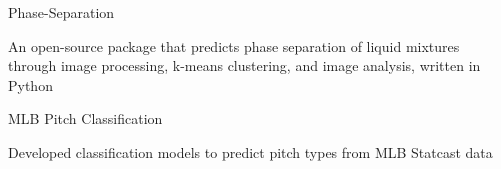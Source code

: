
\begin{cventries}
  \cventry
    {} %
    {Phase-Separation} %
    {} %
    {} %
    {
      \begin{cvitems} %
        \item {An open-source package that predicts phase separation of liquid
            mixtures through image processing, k-means clustering, and image
              analysis, written in Python}
      \end{cvitems}
    }

  \cventry
    {} %
    {MLB Pitch Classification} %
    {} %
    {} %
    {
      \begin{cvitems} %
      	\item {Developed classification models to predict pitch types from MLB
            Statcast data}
      \end{cvitems}
    }

\end{cventries}
